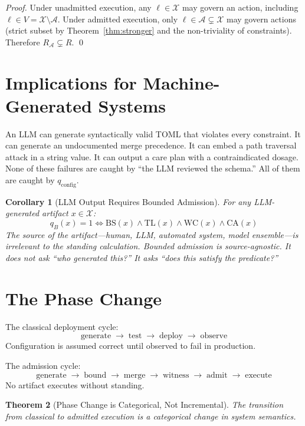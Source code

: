 \documentclass[12pt, letterpaper]{report}
\theoremstyle{plain}
\newtheorem{theorem}{Theorem}[chapter]
\newtheorem{corollary}[theorem]{Corollary}
\theoremstyle{definition}
\theoremstyle{remark}
\newcommand{\qc}{q_{\mathrm{config}}}
\begin{document}
\begin{proof}
Under unadmitted execution, any $\ell \in \mathcal{X}$ may govern an
action, including $\ell \in V = \mathcal{X} \setminus \mathcal{A}$.
Under admitted execution, only $\ell \in \mathcal{A} \subsetneq \mathcal{X}$
may govern actions (strict subset by Theorem~\ref{thm:stronger} and
the non-triviality of constraints).
Therefore $R_\mathcal{A} \subsetneq R$. \qed
\end{proof}

\section{Implications for Machine-Generated Systems}

An LLM can generate syntactically valid TOML that violates every constraint.
It can generate an undocumented merge precedence.
It can embed a path traversal attack in a string value.
It can output a care plan with a contraindicated dosage.
None of these failures are caught by ``the LLM reviewed the schema.''
All of them are caught by $\qc$.

\begin{corollary}[LLM Output Requires Bounded Admission]
For any LLM-generated artifact $x \in \mathcal{X}$:
\[
  q_B(x) = 1 \iff
  \mathrm{BS}(x) \wedge \mathrm{TL}(x) \wedge \mathrm{WC}(x) \wedge \mathrm{CA}(x)
\]
The source of the artifact---human, LLM, automated system, model ensemble---is
irrelevant to the standing calculation.
Bounded admission is \emph{source-agnostic}.
It does not ask ``who generated this?'' It asks ``does this satisfy the predicate?''
\end{corollary}

\section{The Phase Change}

The classical deployment cycle:
\[
  \text{generate} \;\to\; \text{test} \;\to\; \text{deploy} \;\to\; \text{observe}
\]
Configuration is assumed correct until observed to fail in production.

The admission cycle:
\[
  \text{generate} \;\to\; \text{bound} \;\to\; \text{merge} \;\to\;
  \text{witness} \;\to\; \text{admit} \;\to\; \text{execute}
\]
No artifact executes without standing.

\begin{theorem}[Phase Change is Categorical, Not Incremental]
The transition from classical to admitted execution is a categorical change
in system semantics.
\end{theorem}
\end{document}
